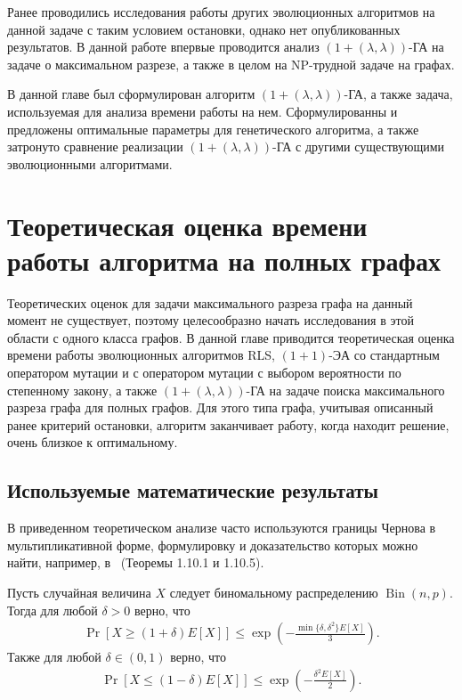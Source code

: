 \documentclass[times]{itmo-student-thesis}
\newcommand{\alglambdaf}{${(1 + (\lambda , \lambda))}$-ГА\xspace}
\newcommand{\oea}{\mbox{$(1 + 1)$-ЭА}\xspace}
\DeclareMathOperator{\Bin}{Bin}
\begin{document}
Ранее проводились исследования работы других эволюционных алгоритмов на данной задаче с таким условием остановки, однако нет опубликованных результатов.
В данной работе впервые проводится анализ \alglambdaf на задаче о максимальном разрезе, а также в целом на NP-трудной задаче на графах.

\chapterconclusion
В данной главе был сформулирован алгоритм \alglambdaf, а также задача, используемая для анализа времени работы на нем. Сформулированны и предложены оптимальные параметры для генетического алгоритма, а также затронуто сравнение реализации \alglambdaf с другими существующими эволюционными алгоритмами.

\chapter{Теоретическая оценка времени работы алгоритма на полных графах}
Теоретических оценок для задачи максимального разреза графа на данный момент не существует, поэтому целесообразно начать исследования в этой области с одного класса графов.
В данной главе приводится теоретическая оценка времени работы эволюционных алгоритмов RLS, \oea со стандартным оператором мутации и с оператором мутации с выбором вероятности по степенному закону, а также \alglambdaf на задаче поиска максимального разреза графа для полных графов.
Для этого типа графа, учитывая описанный ранее критерий остановки, алгоритм заканчивает работу, когда находит решение, очень близкое к оптимальному.

\section{Используемые математические результаты}

В приведенном теоретическом анализе часто используются границы Чернова в мультипликативной форме, формулировку и доказательство которых можно найти, например, в~\cite{Doerr20bookchapter} (Теоремы 1.10.1 и 1.10.5).

\begin{lemma}\label{lem:chernoff}
  Пусть случайная величина $X$ следует биномальному распределению $\Bin(n, p)$. Тогда для любой $\delta > 0$ верно, что
  \begin{align*}
    \Pr[X \ge (1 + \delta)E[X]] \le \exp\left(-\frac{\min\{\delta, \delta^2\}E[X]}{3}\right).
  \end{align*}
  Также для любой $\delta \in (0, 1)$ верно, что
  \begin{align*}
    \Pr[X \le (1 - \delta)E[X]] \le \exp\left(-\frac{\delta^2 E[X]}{2}\right).
  \end{align*}
\end{lemma}
\end{document}
